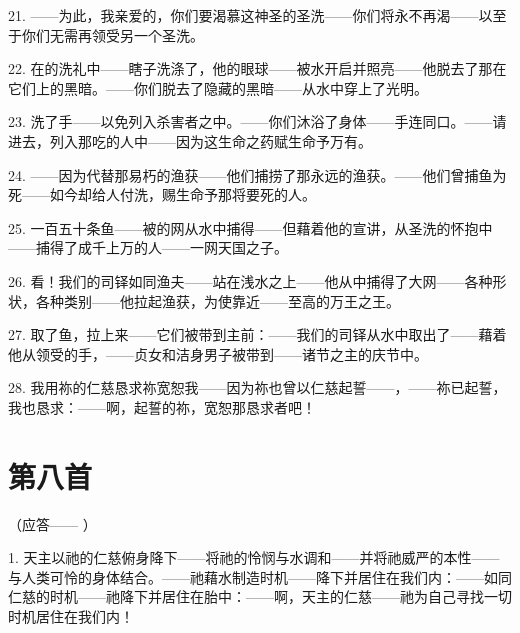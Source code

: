21. ——为此，我亲爱的，你们要渴慕这神圣的圣洗——你们将永不再渴——以至于你们无需再领受另一个圣洗。\par

22. 在的洗礼中——瞎子洗涤了，他的眼球——被水开启并照亮——他脱去了那在它们上的黑暗。——你们脱去了隐藏的黑暗——从水中穿上了光明。\par

23. 洗了手——以免列入杀害者之中。——你们沐浴了身体——手连同口。——请进去，列入那吃的人中——因为这生命之药赋生命予万有。\par

24. ——因为代替那易朽的渔获——他们捕捞了那永远的渔获。——他们曾捕鱼为死——如今却给人付洗，赐生命予那将要死的人。\par

25. 一百五十条鱼——被的网从水中捕得——但藉着他的宣讲，从圣洗的怀抱中——捕得了成千上万的人——一网天国之子。\par

26. 看！我们的司铎如同渔夫——站在浅水之上——他从中捕得了大网——各种形状，各种类别——他拉起渔获，为使靠近——至高的万王之王。\par

27. 取了鱼，拉上来——它们被带到主前：——我们的司铎从水中取出了——藉着他从领受的手，——贞女和洁身男子被带到——诸节之主的庆节中。\par

28. 我用祢的仁慈恳求祢宽恕我——因为祢也曾以仁慈起誓——，——祢已起誓，我也恳求：——啊，起誓的祢，宽恕那恳求者吧！\par


\section{第八首}

（应答—— ）\par

1. 天主以祂的仁慈俯身降下——将祂的怜悯与水调和——并将祂威严的本性——与人类可怜的身体结合。——祂藉水制造时机——降下并居住在我们内：——如同仁慈的时机——祂降下并居住在胎中：——啊，天主的仁慈——祂为自己寻找一切时机居住在我们内！\par

